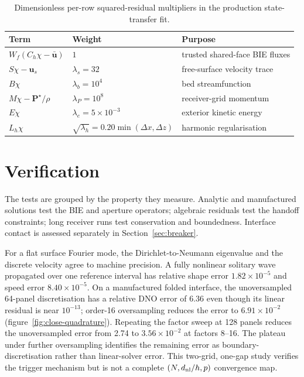 \documentclass[11pt]{article}
\begin{document}
\begin{table}[t]
\centering
\small
\caption{Dimensionless per-row squared-residual multipliers in the production
state-transfer fit.}
\label{tab:fit-weights}
\begin{tabular}{lll}
\toprule
Term & Weight & Purpose \\
\midrule
$W_f(C_h\chi-\bar{\boldsymbol u})$ & $1$ & trusted shared-face BIE fluxes \\
$S\chi-\boldsymbol u_s$ & $\lambda_s=32$ & free-surface velocity trace \\
$B\chi$ & $\lambda_b=10^4$ & bed streamfunction \\
$M\chi-\boldsymbol P^\star/\rho$ & $\lambda_P=10^8$ & receiver-grid momentum \\
$E\chi$ & $\lambda_e=5\times10^{-3}$ & exterior kinetic energy \\
$L_h\chi$ & $\sqrt{\lambda_h}=0.20\min(\Delta x,\Delta z)$ & harmonic regularisation \\
\bottomrule
\end{tabular}
\end{table}

\section{Verification}

The tests are grouped by the property they measure.  Analytic and manufactured
solutions test the BIE and aperture operators; algebraic residuals test the
handoff constraints; long receiver runs test conservation and boundedness.
Interface contact is assessed separately in Section~\ref{sec:breaker}.

For a flat surface Fourier mode, the Dirichlet-to-Neumann eigenvalue and the
discrete velocity agree to machine precision.  A fully nonlinear solitary
wave propagated over one reference interval has relative shape error
$1.82\times10^{-5}$ and speed error $8.40\times10^{-5}$.  On a manufactured
folded interface, the unoversampled 64-panel discretisation has a relative DNO
error of 6.36 even though its linear residual is near $10^{-13}$; order-16
oversampling reduces the error to $6.91\times10^{-2}$
(figure~\ref{fig:close-quadrature}).  Repeating the factor sweep at 128 panels
reduces the unoversampled error from 2.74 to $3.56\times10^{-2}$ at factors
8--16.  The plateau under further oversampling identifies the remaining error
as boundary-discretisation rather than linear-solver error.  This two-grid,
one-gap study verifies the trigger mechanism but is not a complete
$(N,d_{\rm nl}/h,p)$ convergence map.
\end{document}
